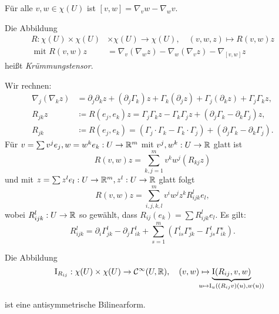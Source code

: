\documentclass{cheat-sheet}
\newcommand{\I}{\mathrm{I}}
\begin{document}
\begin{satz}
  Für alle $v, w \in \chi(U)$ ist $[v, w] = \nabla_v w - \nabla_w v$.
\end{satz}


\begin{definition}
  Die Abbildung
  \begin{align*}
    R : \chi(U) \times \chi(U) &\times \chi(U) \to \chi(U), \quad (v, w, z) \mapsto R(v, w) z \\
    \text{ mit } R(v, w) z &= \nabla_v (\nabla_w z) - \nabla_w (\nabla_v z) - \nabla_{[v, w]} z
  \end{align*}
  heißt \emph{Krümmungstensor}.
\end{definition}


\begin{bem}
  Wir rechnen:
  \begin{align*}
    \nabla_j (\nabla_k z) &= \partial_j \partial_k z + (\partial_j \Gamma_k) z + \Gamma_k (\partial_j z) + \Gamma_j (\partial_k z) + \Gamma_j \Gamma_k z, \\
    R_{jk} z &\coloneqq R(e_j, e_k) z = \Gamma_j \Gamma_k z - \Gamma_k \Gamma_j z + (\partial_j \Gamma_k - \partial_k \Gamma_j) z, \\
    R_{jk} &\coloneqq R(e_j, e_k) = (\Gamma_j \cdot \Gamma_k - \Gamma_k \cdot \Gamma_j) + (\partial_j \Gamma_k - \partial_k \Gamma_j).
  \end{align*}
  Für $v = \sum v^j e_j, w = w^k e_k : U \to \R^m$ mit $v^j, w^k : U \to \mathbb{R}$ glatt ist
  \[ R(v, w) z = \sum_{k,j=1}^m v^k w^j (R_{kj} z) \]
  und mit $z = \sum z^l e_l : U \to \R^m, z^l : U \to \R$ glatt folgt
  \[ R(v, w) z = \sum_{i,j,k,l}^m v^i w^j z^k R_{ijk}^l e_l, \]
  wobei $R_{ijk}^l : U \to \mathbb{R}$ so gewählt, dass $R_{ij}(e_k) = \sum R_{ijk}^l e_l$. Es gilt:
  \[ R_{ijk}^l = \partial_i \Gamma_{jk}^l - \partial_j \Gamma_{ik}^l + \sum_{s=1}^m (\Gamma_{is}^l \Gamma_{jk}^s - \Gamma_{js}^l \Gamma_{ik}^s). \]
\end{bem}

\begin{satz}
  Die Abbildung
  \[
    \I_{R_{ij}} : \chi(U) \times \chi(U) \to \mathcal{C}^\infty(U, \R), \quad
    (v, w) \mapsto \underbrace{\I(R_{ij}, v, w)}_{\mathclap{u \mapsto \I_u((R_{ij} v)(u), w(u))}}
  \]

  \vspace{-12pt}

  ist eine antisymmetrische Bilinearform.
\end{satz}
\end{document}
